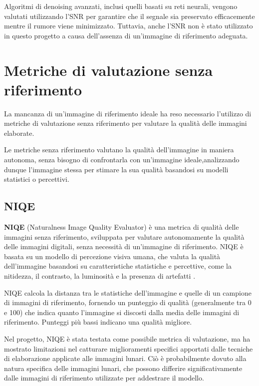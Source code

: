 Algoritmi di denoising avanzati, inclusi quelli basati su reti neurali, vengono valutati utilizzando l'SNR per garantire che il segnale sia preservato efficacemente mentre il rumore viene minimizzato. Tuttavia, anche l'SNR non è stato utilizzato in questo progetto a causa dell'assenza di un'immagine di riferimento adeguata.

\section{Metriche di valutazione senza riferimento} \label{sec:nr_metrics}

La mancanza di un'immagine di riferimento ideale ha reso necessario l'utilizzo di metriche di valutazione senza riferimento per valutare la qualità delle immagini elaborate.

Le metriche senza riferimento valutano la qualità dell'immagine in maniera autonoma, senza bisogno di confrontarla con un'immagine ideale,analizzando dunque l'immagine stessa per stimare la sua qualità basandosi su modelli statistici o percettivi.

\subsection{NIQE} \label{subsec:niqe}

\textbf{NIQE} (Naturalness Image Quality Evaluator) è una metrica di qualità delle immagini senza riferimento, sviluppata per valutare autonomamente la qualità delle immagini digitali, senza necessità di un'immagine di riferimento. NIQE è basata su un modello di percezione visiva umana, che valuta la qualità dell'immagine basandosi su caratteristiche statistiche e percettive, come la nitidezza, il contrasto, la luminosità e la presenza di artefatti \cite{niqe}.

NIQE calcola la distanza tra le statistiche dell'immagine e quelle di un campione di immagini di riferimento, fornendo un punteggio di qualità (generalmente tra 0 e 100) che indica quanto l'immagine si discosti dalla media delle immagini di riferimento. Punteggi più bassi indicano una qualità migliore.

Nel progetto, NIQE è stata testata come possibile metrica di valutazione, ma ha mostrato limitazioni nel catturare miglioramenti specifici apportati dalle tecniche di elaborazione applicate alle immagini lunari. Ciò è probabilmente dovuto alla natura specifica delle immagini lunari, che possono differire significativamente dalle immagini di riferimento utilizzate per addestrare il modello.

